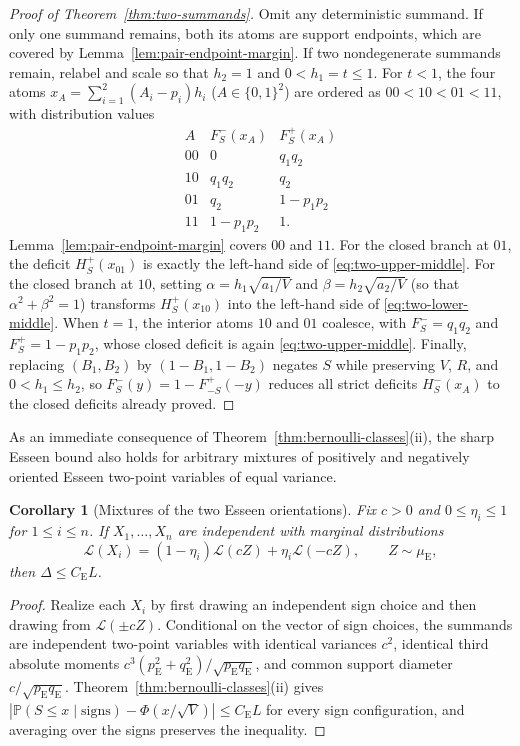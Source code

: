 \documentclass[11pt]{article}
\numberwithin{equation}{section}
\newtheorem{corollary}[theorem]{Corollary}
\theoremstyle{definition}
\theoremstyle{remark}
\newcommand{\Pp}{\mathbb P}
\newcommand{\be}{C_{\mathrm E}}
\begin{document}
\begin{proof}[Proof of Theorem~\ref{thm:two-summands}]
Omit any deterministic summand. If only one summand remains, both its atoms
are support endpoints, which are covered by Lemma~\ref{lem:pair-endpoint-margin}.
If two nondegenerate summands remain, relabel and scale so that $h_2=1$ and
$0<h_1=t\leq1$. For $t<1$, the four atoms $x_A=\sum_{i=1}^2(A_i-p_i)h_i$
($A\in\{0,1\}^2$) are ordered as $00<10<01<11$, with distribution values
\[
\begin{array}{c|cc}
 A&F_S^-(x_A)&F_S^+(x_A)\\\hline
 00&0&q_1q_2\\
 10&q_1q_2&q_2\\
 01&q_2&1-p_1p_2\\
 11&1-p_1p_2&1.
\end{array}
\]
Lemma~\ref{lem:pair-endpoint-margin} covers $00$ and $11$. For the closed
branch at $01$, the deficit $H_S^+(x_{01})$ is exactly the left-hand side of
\eqref{eq:two-upper-middle}. For the closed branch at $10$, setting
$\alpha=h_1\sqrt{a_1/V}$ and $\beta=h_2\sqrt{a_2/V}$ (so that
$\alpha^2+\beta^2=1$) transforms $H_S^+(x_{10})$ into the left-hand side of
\eqref{eq:two-lower-middle}. When $t=1$, the interior atoms $10$ and $01$
coalesce, with $F_S^-=q_1q_2$ and $F_S^+=1-p_1p_2$, whose closed deficit is
again \eqref{eq:two-upper-middle}. Finally, replacing $(B_1,B_2)$ by
$(1-B_1,1-B_2)$ negates $S$ while preserving $V$, $R$, and $0<h_1\le h_2$,
so $F_S^-(y)=1-F_{-S}^+(-y)$ reduces all strict deficits $H_S^-(x_A)$ to the
closed deficits already proved.
\end{proof}

As an immediate consequence of Theorem~\ref{thm:bernoulli-classes}(ii), the
sharp Esseen bound also holds for arbitrary mixtures of positively and
negatively oriented Esseen two-point variables of equal variance.

\begin{samepage}
\begin{corollary}[Mixtures of the two Esseen orientations]\label{cor:mixtures}
Fix $c>0$ and $0\leq\eta_i\leq1$ for $1\le i\le n$. If $X_1,\ldots,X_n$ are
independent with marginal distributions
\[
 \mathcal L(X_i)=(1-\eta_i)\mathcal L(cZ)+\eta_i\mathcal L(-cZ),
 \qquad Z\sim\mu_{\mathrm E},
\]
then $\Delta\leq\be L$.
\end{corollary}
\end{samepage}
\begin{proof}
Realize each $X_i$ by first drawing an independent sign choice and then
drawing from $\mathcal L(\pm cZ)$. Conditional on the vector of sign choices,
the summands are independent two-point variables with identical variances
$c^2$, identical third absolute moments $c^3(p_{\mathrm E}^2+q_{\mathrm E}^2)/\sqrt{p_{\mathrm E}q_{\mathrm E}}$,
and common support diameter $c/\sqrt{p_{\mathrm E}q_{\mathrm E}}$.
Theorem~\ref{thm:bernoulli-classes}(ii) gives $|\Pp(S\le x\mid\text{signs})-\Phi(x/\sqrt V)|\le\be L$
for every sign configuration, and averaging over the signs preserves the
inequality.
\end{proof}
\end{document}
